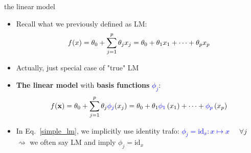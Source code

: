 \documentclass[11pt,compress,t,notes=noshow, xcolor=table]{beamer}
\begin{document}
\begin{vbframe}{the linear model}

\begin{itemize}
    \item Recall what we previously defined as LM:
    \begin{equation} \label{simple_lm}
      f(x) = \theta_0 + \sum\limits_{j=1}^p \theta_j x_j =
      \theta_0 + \theta_1 x_1 + \dots + \theta_p x_p
    \end{equation}
    \item Actually, just special case of "true" LM 
    \item \textbf{The linear model} with \textbf{basis functions}
    \textcolor{blue}{$\phi_j$}:
    \begin{equation*} \label{true_lm}
      f(\mathbf{x}) = \theta_0 + \sum\limits_{j=1}^p \theta_j \textcolor{blue}{\phi_j} (x_j)
      = \theta_0 + \theta_1  \textcolor{blue}{\phi_1} \left( x_1 \right)
      + \dots + \textcolor{blue}{\phi_p} \left(x_p \right)
    \end{equation*}
    \item In Eq.~\ref{simple_lm}, we implicitly use identity trafo:
    \textcolor{blue}{$\phi_j = \text{id}_x: x \mapsto x$}~~ $\forall j$ \\
    $\rightsquigarrow$ we often say LM and imply
    $\phi_j = \text{id}_x$
\end{itemize}

\end{vbframe}

\end{document}
